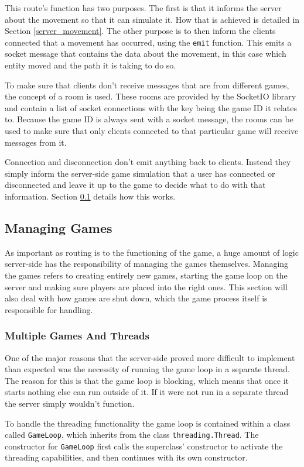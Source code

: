 This route's function has two purposes. The first is that it informs the server about the movement so that it can simulate it. How that is achieved is detailed in Section \ref{server_movement}. The other purpose is to then inform the clients connected that a movement has occurred, using the \texttt{emit} function. This emits a socket message that contains the data about the movement, in this case which entity moved and the path it is taking to do so.

To make sure that clients don't receive messages that are from different games, the concept of a room is used. These rooms are provided by the SocketIO library and contain a list of socket connections with the key being the game ID it relates to. Because the game ID is always sent with a socket message, the rooms can be used to make sure that only clients connected to that particular game will receive messages from it.

Connection and disconnection don't emit anything back to clients. Instead they simply inform the server-side game simulation that a user has connected or disconnected and leave it up to the game to decide what to do with that information. Section \ref{managing_games} details how this works.

\subsection{Managing Games}\label{managing_games}
As important as routing is to the functioning of the game, a huge amount of logic server-side has the responsibility of managing the games themselves. Managing the games refers to creating entirely new games, starting the game loop on the server and making sure players are placed into the right ones. This section will also deal with how games are shut down, which the game process itself is responsible for handling.

\subsubsection{Multiple Games And Threads}
One of the major reasons that the server-side proved more difficult to implement than expected was the necessity of running the game loop in a separate thread. The reason for this is that the game loop is blocking, which means that once it starts nothing else can run outside of it. If it were not run in a separate thread the server simply wouldn't function.

To handle the threading functionality the game loop is contained within a class called \texttt{GameLoop}, which inherits from the class \texttt{threading.Thread}. The constructor for \texttt{GameLoop} first calls the superclass' constructor to activate the threading capabilities, and then continues with its own constructor.

